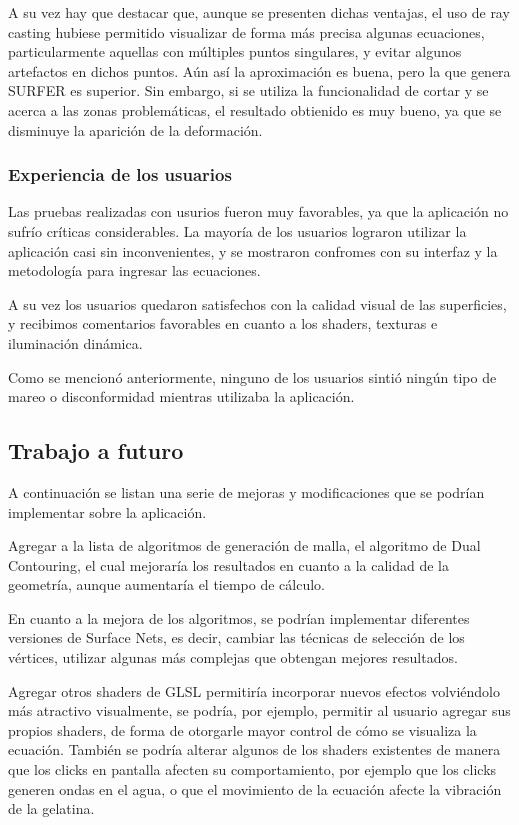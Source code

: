 \documentclass[12pt]{article}
\begin{document}
A su vez hay que destacar que, aunque se presenten dichas ventajas, el uso de ray casting hubiese permitido visualizar de forma más precisa algunas ecuaciones, particularmente aquellas con múltiples puntos singulares, y evitar algunos artefactos en dichos puntos. Aún así la aproximación es buena, pero la que genera SURFER es superior. Sin embargo, si se utiliza la funcionalidad de cortar y se acerca a las zonas problemáticas, el resultado obtienido es muy bueno, ya que se disminuye la aparición de la deformación.

\subsubsection{Experiencia de los usuarios}
\noindent Las pruebas realizadas con usurios fueron muy favorables, ya que la aplicación no sufrío críticas considerables. La mayoría de los usuarios lograron utilizar la aplicación casi sin inconvenientes, y se mostraron confromes con su interfaz y la metodología para ingresar las ecuaciones.

A su vez los usuarios quedaron satisfechos con la calidad visual de las superficies, y recibimos comentarios favorables en cuanto a los shaders, texturas e iluminación dinámica.

Como se mencionó anteriormente, ninguno de los usuarios sintió ningún tipo de mareo o disconformidad mientras utilizaba la aplicación.

\subsection{Trabajo a futuro}
\noindent A continuación se listan una serie de mejoras y modificaciones que se podrían implementar sobre la aplicación.

Agregar a la lista de algoritmos de generación de malla, el algoritmo de Dual Contouring\cite{dualcontour}, el cual mejoraría los resultados en cuanto a la calidad de la geometría, aunque aumentaría el tiempo de cálculo. 

En cuanto a la mejora de los algoritmos, se podrían implementar diferentes versiones de Surface Nets, es decir, cambiar las técnicas de selección de los vértices, utilizar algunas más complejas que obtengan mejores resultados.

Agregar otros shaders de GLSL permitiría incorporar nuevos efectos volviéndolo más atractivo visualmente, se podría, por ejemplo, permitir al usuario agregar sus propios shaders, de forma de otorgarle  mayor control de cómo se visualiza la ecuación. También se podría alterar algunos de los shaders existentes de manera que los clicks en pantalla afecten su comportamiento, por ejemplo que los clicks generen ondas en el agua, o que el movimiento de la ecuación afecte la vibración de la gelatina.
\end{document}
